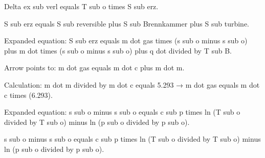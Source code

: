 Delta ex sub verl equals T sub o times S sub erz.  

S sub erz equals S sub reversible plus S sub Brennkammer plus S sub turbine.  

Expanded equation:  
S sub erz equals m dot gas times (s sub o minus s sub o) plus m dot times (s sub o minus s sub o) plus q dot divided by T sub B.  

Arrow points to:  
m dot gas equals m dot c plus m dot m.  

Calculation:  
m dot m divided by m dot c equals 5.293 → m dot gas equals m dot c times (6.293).  

Expanded equation:  
s sub o minus s sub o equals c sub p times ln (T sub o divided by T sub o) minus ln (p sub o divided by p sub o).  

s sub o minus s sub o equals c sub p times ln (T sub o divided by T sub o) minus ln (p sub o divided by p sub o).